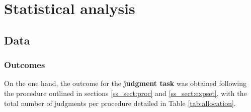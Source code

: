 \section{Statistical analysis}
%
\subsection{Data} \label{s_sect:data}
%
\subsubsection{Outcomes} \label{ss_sect:outcome}
%
On the one hand, the outcome for the \textbf{judgment task} was obtained following the procedure outlined in sections \ref{ss_sect:proc} and \ref{ss_sect:expset}, with the total number of judgments per procedure detailed in Table \ref{tab:allocation}.

